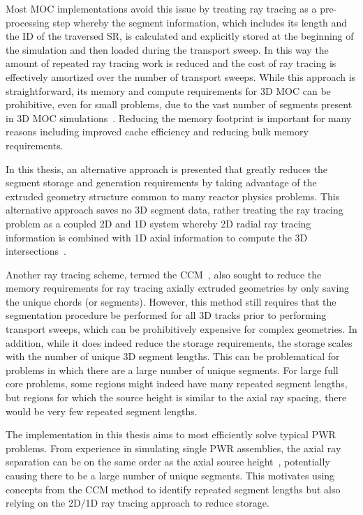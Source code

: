 Most \ac{MOC} implementations avoid this issue by treating ray tracing as a pre-processing step whereby the segment information, which includes its length and the ID of the traversed \ac{SR}, is calculated and explicitly stored at the beginning of the simulation and then loaded during the transport sweep. In this way  the amount of repeated ray tracing work is reduced and the cost of ray tracing is effectively amortized over the number of transport sweeps. While this approach is straightforward, its memory and compute requirements for 3D \ac{MOC} can be prohibitive, even for small problems, due to the vast number of segments present in 3D \ac{MOC} simulations~\cite{physor2016otf}. Reducing the memory footprint is important for many reasons including improved cache efficiency and reducing bulk memory requirements.

In this thesis, an alternative approach is presented that greatly reduces the segment storage and generation requirements by taking advantage of the extruded geometry structure common to many reactor physics problems. This alternative approach saves no 3D segment data, rather treating the ray tracing problem as a coupled 2D and 1D system whereby 2D radial ray tracing information is combined with 1D axial information to compute the 3D intersections~\cite{pyhsor2016otf}.

Another ray tracing scheme, termed the \ac{CCM}~\cite{Sciannandrone2015}, also sought to reduce the memory requirements for ray tracing axially extruded geometries by only saving the unique chords (or segments).  However, this method still requires that the segmentation procedure be performed for all 3D tracks prior to performing transport sweeps, which can be prohibitively expensive for complex geometries. In addition, while it does indeed reduce the storage requirements, the storage scales with the number of unique 3D segment lengths. This can be problematical for problems in which there are a large number of unique segments. For large full core problems, some regions might indeed have many repeated segment lengths, but regions for which the source height is similar to the axial ray spacing, there would be very few repeated segment lengths.

The implementation in this thesis aims to most efficiently solve typical \ac{PWR} problems. From experience in simulating single \ac{PWR} assemblies, the axial ray separation can be on the same order as the axial source height~\cite{openmoc-beavrs}, potentially causing there to be a large number of unique segments. This motivates using concepts from the \ac{CCM} method to identify repeated segment lengths but also relying on the 2D/1D ray tracing approach to reduce storage.

